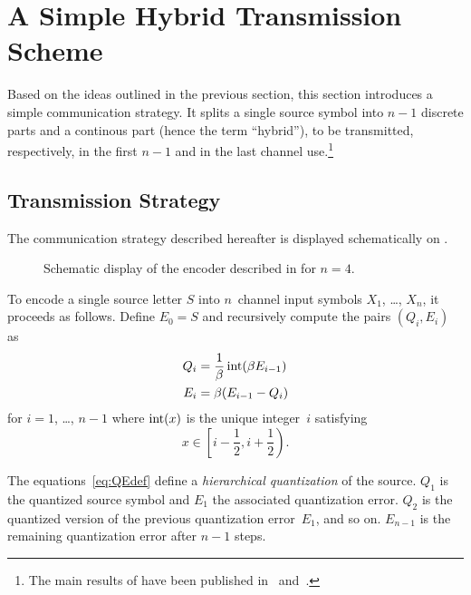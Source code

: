 
\section{A Simple Hybrid Transmission Scheme}\label{sec:scalarquant}

Based on the ideas outlined in the previous section, this section
introduces a simple communication strategy. It splits a single source symbol
into $n-1$ discrete parts and a continous part (hence the term ``hybrid''), to
be transmitted, respectively, in the first $n-1$ and in the last channel
use.\footnote{The main results of  have been published
in~\cite{KleinerR2009b} and~\cite{KleinerR2010}.}


\subsection{Transmission Strategy}\label{sec:commscheme}

The communication strategy described hereafter is displayed schematically on
.
\begin{figure}
  \begin{center}
    
  \end{center}
  \caption{Schematic display of the encoder described in  for
  $n = 4$.}
  \label{fig:1nencoding}
\end{figure}
To encode a single source letter $S$ into $n$~channel input symbols $X_1$,
\dots, $X_n$, it proceeds as follows. Define $E_0 = S$ and recursively compute
the pairs $(Q_i, E_i)$ as
\begin{subequations}\label{eq:QEdef}
\begin{align}
  Q_i &= \frac{1}{\beta}\operatorname{int}(\beta E_{i-1}) \label{eq:QEdefA} \\
  E_i &= \beta (E_{i-1} - Q_i) \label{eq:QEdefB}
\end{align}
\end{subequations}
for $i = 1$, \dots, $n-1$ where $\operatorname{int}(x)$ is the unique integer~$i$ satisfying
\begin{equation*}
  x \in \left[i - \frac12, i +\frac12\right).
\end{equation*}

The equations~\ref{eq:QEdef} define a \emph{hierarchical quantization} of the
source. $Q_1$ is the quantized source symbol and $E_1$ the associated
quantization error. $Q_2$ is the quantized version of the previous quantization
error~$E_1$, and so on. $E_{n-1}$ is the remaining quantization error after
$n-1$ steps.

